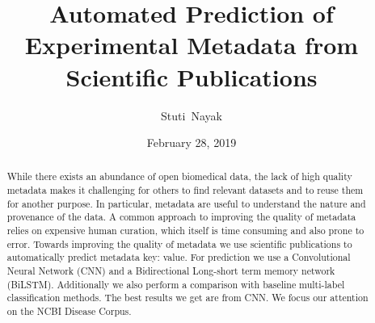 \documentclass[10pt]{reportMaster}
\title{Automated Prediction of Experimental Metadata from Scientific Publications}
\author{Stuti\ Nayak}
\date{February 28, 2019}
\begin{document}
\maketitle
\begin{abstract}
    While there exists an abundance of open biomedical data, the lack of high quality metadata makes it challenging for others to find relevant datasets and to reuse them for another purpose. In particular, metadata are useful to understand the nature and provenance of the data. A common approach to improving the quality of metadata relies on expensive human curation, which itself is time consuming and also prone to error. Towards improving the quality of metadata we use scientific publications to automatically predict metadata key: value. For prediction we use a Convolutional Neural Network (CNN) and  a Bidirectional Long-short term memory network (BiLSTM). Additionally we also perform a comparison with baseline multi-label classification methods. The best results we get are from CNN. We focus our attention on the NCBI Disease Corpus. 
\end{abstract}

\renewcommand{\abstractname}{Acknowledgements}
\begin{abstract}

 
 
\end{abstract}

\tableofcontents

\listoffigures
 
\listoftables








%

%




\end{document}
